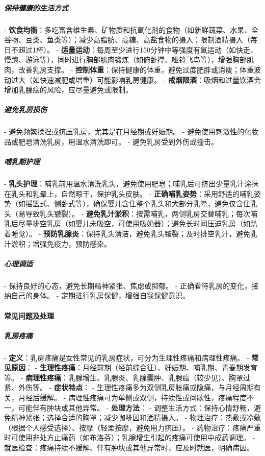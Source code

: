 \begin{enumerate}
\subparagraph{保持健康的生活方式}
- \textbf{饮食均衡}：多吃富含维生素、矿物质和抗氧化剂的食物（如新鲜蔬菜、水果、全谷物、豆类、鱼类等）；减少高脂肪、高糖、高盐食物的摄入；限制酒精摄入（每日不超过1杯）。
- \textbf{适量运动}：每周至少进行150分钟中等强度有氧运动（如快走、慢跑、游泳等），同时进行胸部肌肉锻炼（如俯卧撑、哑铃飞鸟等），增强胸部肌肉，改善乳房支撑。
- \textbf{控制体重}：保持健康的体重，避免过度肥胖或消瘦；体重波动过大（如快速减肥或增重）可能影响乳房健康。
- \textbf{戒烟限酒}：吸烟和过量饮酒会增加乳腺癌的风险，应尽量避免或限制。

\subparagraph{避免乳房损伤}
- 避免频繁揉捏或挤压乳房，尤其是在月经期或妊娠期。
- 避免使用刺激性的化妆品或肥皂清洗乳房，用温水清洗即可。
- 避免乳房受到外伤或撞击。

\subparagraph{哺乳期护理}
- \textbf{乳头护理}：哺乳前用温水清洗乳头，避免使用肥皂；哺乳后可挤出少量乳汁涂抹在乳头和乳晕上，自然晾干，保护乳头皮肤。
- \textbf{正确哺乳姿势}：采用舒适的哺乳姿势（如摇篮式、侧卧式等），确保婴儿含住整个乳头和大部分乳晕，避免仅含住乳头（易导致乳头皲裂）。
- \textbf{避免乳汁淤积}：按需哺乳，两侧乳房交替哺乳；每次哺乳后尽量排空乳房（如婴儿未吸空，可使用吸奶器）；避免长时间压迫乳房（如趴着睡觉）。
- \textbf{预防乳腺炎}：保持乳头清洁，避免乳头皲裂；及时排空乳汁，避免乳汁淤积；增强免疫力，预防感染。

\subparagraph{心理调适}
- 保持良好的心态，避免长期精神紧张、焦虑或抑郁。
- 正确看待乳房的变化，接纳自己的身体。
- 定期进行乳房保健，增强自我保健意识。

\paragraph{常见问题及处理}

\subparagraph{乳房疼痛}
- \textbf{定义}：乳房疼痛是女性常见的乳房症状，可分为生理性疼痛和病理性疼痛。
- \textbf{常见原因}：
  - \textbf{生理性疼痛}：月经前期（经前综合征）、妊娠期、哺乳期、青春期发育等。
  - \textbf{病理性疼痛}：乳腺增生、乳腺炎、乳腺囊肿、乳腺癌（较少见）、胸罩过紧、外伤等。
- \textbf{症状特点}：
  - 生理性疼痛多为双侧乳房胀痛或隐痛，与月经周期有关，月经后缓解。
  - 病理性疼痛可为单侧或双侧，持续性或间歇性，疼痛程度不一，可能伴有肿块或其他异常。
- \textbf{处理方法}：
  - 调整生活方式：保持心情舒畅，避免精神紧张；选择合适的胸罩；减少咖啡因和酒精摄入。
  - 物理治疗：热敷或冷敷（根据个人感受选择）、按摩（轻柔按摩，避免用力挤压）。
  - 药物治疗：疼痛严重时可使用非处方止痛药（如布洛芬）；乳腺增生引起的疼痛可使用中成药调理。
  - 就医检查：疼痛持续不缓解、伴有肿块或其他异常时，应及时就医，明确病因。


\end{enumerate}
